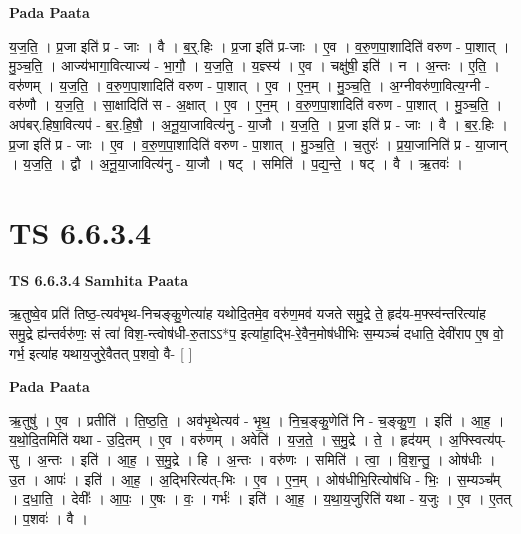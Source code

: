 \documentclass[17pt]{extarticle}
\begin{document}
\textbf{Pada Paata} \newline

य॒ज॒ति॒ । प्र॒जा इति॑ प्र - जाः । वै । ब॒र्॒.हिः । प्र॒जा इति॑ प्र-जाः । ए॒व । व॒रु॒ण॒पा॒शादिति॑ वरुण - पा॒शात् । मु॒ञ्च॒ति॒ । आज्य॑भागा॒वित्याज्य॑ - भा॒गौ॒ । य॒ज॒ति॒ । य॒ज्ञ्स्य॑ । ए॒व । चक्षु॑षी॒ इति॑ । न । अ॒न्तः । ए॒ति॒ । वरु॑णम् । य॒ज॒ति॒ । व॒रु॒ण॒पा॒शादिति॑ वरुण - पा॒शात् । ए॒व । ए॒न॒म् । मु॒ञ्च॒ति॒ । अ॒ग्नीवरु॑णा॒वित्य॒ग्नी - वरु॑णौ । य॒ज॒ति॒ । सा॒क्षादिति॑ स - अ॒क्षात् । ए॒व । ए॒न॒म् । व॒रु॒ण॒पा॒शादिति॑ वरुण - पा॒शात् । मु॒ञ्च॒ति॒ । अप॑बर्.हिषा॒वित्यप॑ - ब॒र॒.हि॒षौ॒ । अ॒नू॒या॒जावित्य॑नु - या॒जौ । य॒ज॒ति॒ । प्र॒जा इति॑ प्र - जाः । वै । ब॒र॒.हिः । प्र॒जा इति॑ प्र - जाः । ए॒व । व॒रु॒ण॒पा॒शादिति॑ वरुण - पा॒शात् । मु॒ञ्च॒ति॒ । च॒तुरः॑ । प्र॒या॒जानिति॑ प्र - या॒जान् । य॒ज॒ति॒ । द्वौ । अ॒नू॒या॒जावित्य॑नु - या॒जौ । षट् । समिति॑ । प॒द्य॒न्ते॒ । षट् । वै । ऋ॒तवः॑ ।  \newline





\section{ TS 6.6.3.4 }

\textbf{TS 6.6.3.4 } \newline
\textbf{Samhita Paata} \newline

ऋ॒तुष्वे॒व प्रति॑ तिष्ठ॒-त्यव॑भृथ-निचङ्कु॒णेत्या॑ह यथोदि॒तमे॒व वरु॑ण॒मव॑ यजते समु॒द्रे ते॒ हृद॑य-म॒फ्स्व॑न्तरित्या॑ह समु॒द्रे ह्य॑न्तर्वरु॑णः॒ सं त्वा॑ विश॒-न्त्वोष॑धी-रु॒ताऽऽ*प॒ इत्या॑हा॒द्भि-रे॒वैन॒मोष॑धीभिः स॒म्यञ्चं॑ दधाति॒ देवी॑राप ए॒ष वो॒ गर्भ॒ इत्या॑ह यथाय॒जुरे॒वैतत् प॒शवो॒ वै- [  ] \newline

\textbf{Pada Paata} \newline

ऋ॒तुषु॑ । ए॒व । प्रतीति॑ । ति॒ष्ठ॒ति॒ । अव॑भृ॒थेत्यव॑ - भृ॒थ॒ । नि॒च॒ङ्कु॒णेति॑ नि - च॒ङ्कु॒ण॒ । इति॑ । आ॒ह॒ । य॒थो॒दि॒तमिति॑ यथा - उ॒दि॒तम् । ए॒व । वरु॑णम् । अवेति॑ । य॒ज॒ते॒ । स॒मु॒द्रे । ते॒ । हृद॑यम् । अ॒फ्स्वित्य॑प्-सु । अ॒न्तः । इति॑ । आ॒ह॒ । स॒मु॒द्रे । हि । अ॒न्तः । वरु॑णः । समिति॑ । त्वा॒ । वि॒श॒न्तु॒ । ओष॑धीः । उ॒त । आपः॑ । इति॑ । आ॒ह॒ । अ॒द्भिरित्य॑त्-भिः । ए॒व । ए॒न॒म् । ओष॑धीभि॒रित्योष॑धि - भिः॒ । स॒म्यञ्च᳚म् । द॒धा॒ति॒ । देवीः᳚ । आ॒पः॒ । ए॒षः । वः॒ । गर्भः॑ । इति॑ । आ॒ह॒ । य॒था॒य॒जुरिति॑ यथा - य॒जुः । ए॒व । ए॒तत् । प॒शवः॑ । वै ।  \newline
\end{document}
